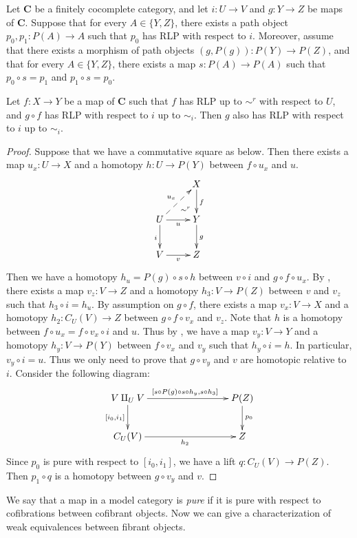 \documentclass{amsart}
\theoremstyle{definition}
\newcommand{\cat}[1]{\mathbf{#1}}
\newcommand{\C}{\cat{C}}
\newcommand{\cyli}{i}
\begin{document}
\begin{lem}[we-bot]
Let $\C$ be a finitely cocomplete category, and let $i : U \to V$ and $g : Y \to Z$ be maps of $\C$.
Suppose that for every $A \in \{ Y, Z \}$, there exists a path object $p_0,p_1 : P(A) \to A$ such that $p_0$ has RLP with respect to $i$.
Moreover, assume that there exists a morphism of path objects $(g,P(g)) : P(Y) \to P(Z)$,
and that for every $A \in \{ Y, Z \}$, there exists a map $s : P(A) \to P(A)$ such that $p_0 \circ s = p_1$ and $p_1 \circ s = p_0$.

Let $f : X \to Y$ be a map of $\C$ such that $f$ has RLP up to $\sim^r$ with respect to $U$, and $g \circ f$ has RLP with respect to $i$ up to $\sim_i$.
Then $g$ also has RLP with respect to $i$ up to $\sim_i$.
\end{lem}
\begin{proof}
Suppose that we have a commutative square as below.
Then there exists a map $u_x : U \to X$ and a homotopy $h : U \to P(Y)$ between $f \circ u_x$ and $u$.
\[ \xymatrix{   \ar@{}[dr]|(.7){\sim^r}               & X \ar[d]^f \\
              U \ar@{-->}[ur]^{u_x} \ar[d]_i \ar[r]_u & Y \ar[d]^g \\
              V \ar[r]_v                              & Z
            } \]
Then we have a homotopy $h_u = P(g) \circ s \circ h$ between $v \circ i$ and $g \circ f \circ u_x$.
By , there exists a map $v_z : V \to Z$ and a homotopy $h_3 : V \to P(Z)$ between $v$ and $v_z$ such that $h_3 \circ i = h_u$.
By assumption on $g \circ f$, there exists a map $v_x : V \to X$ and a homotopy $h_2 : C_U(V) \to Z$ between $g \circ f \circ v_x$ and $v_z$.
Note that $h$ is a homotopy between $f \circ u_x = f \circ v_x \circ i$ and $u$.
Thus by , we have a map $v_y : V \to Y$ and a homotopy $h_y : V \to P(Y)$ between $f \circ v_x$ and $v_y$ such that $h_y \circ i = h$.
In particular, $v_y \circ i = u$.
Thus we only need to prove that $g \circ v_y$ and $v$ are homotopic relative to $i$.
Consider the following diagram:
\[ \xymatrix{ V \amalg_U V \ar[rrr]^{[s \circ P(g) \circ s \circ h_y, s \circ h_3]} \ar[d]_{[\cyli_0,\cyli_1]} & & & P(Z) \ar[d]^{p_0} \\
              C_U(V) \ar[rrr]_{h_2} & & & Z
            } \]
Since $p_0$ is pure with respect to $[\cyli_0,\cyli_1]$, we have a lift $q : C_U(V) \to P(Z)$.
Then $p_1 \circ q$ is a homotopy between $g \circ v_y$ and $v$.
\end{proof}

We say that a map in a model category is \emph{pure} if it is pure with respect to cofibrations between cofibrant objects.
Now we can give a characterization of weak equivalences between fibrant objects.
\end{document}
